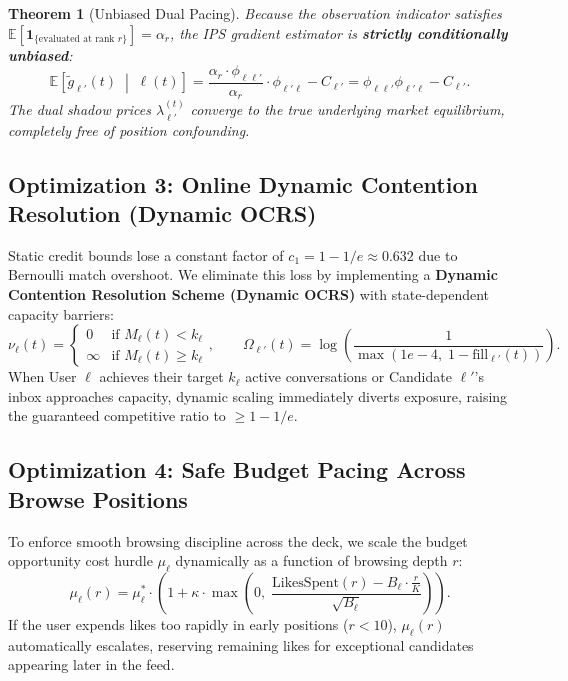 \documentclass[11pt,letterpaper]{article}
\theoremstyle{definition}
\theoremstyle{plain}
\newtheorem{theorem}{Theorem}[section]
\theoremstyle{remark}
\begin{document}
\begin{theorem}[Unbiased Dual Pacing]
Because the observation indicator satisfies $\mathbb{E}[\mathbf{1}_{\{\text{evaluated at rank } r\}}] = \alpha_r$, the IPS gradient estimator is \textbf{strictly conditionally unbiased}:
\begin{equation}
    \mathbb{E}\left[ \tilde{g}_{\ell'}(t) \;\middle|\; \ell(t) \right] = \frac{\alpha_r \cdot \phi_{\ell\ell'}}{\alpha_r} \cdot \phi_{\ell'\ell} - C_{\ell'} = \phi_{\ell\ell'} \phi_{\ell'\ell} - C_{\ell'}.
\end{equation}
The dual shadow prices $\lambda_{\ell'}^{(t)}$ converge to the true underlying market equilibrium, completely free of position confounding.
\end{theorem}

\subsection{Optimization 3: Online Dynamic Contention Resolution (Dynamic OCRS)}
Static credit bounds lose a constant factor of $c_1 = 1 - 1/e \approx 0.632$ due to Bernoulli match overshoot. We eliminate this loss by implementing a \textbf{Dynamic Contention Resolution Scheme (Dynamic OCRS)} with state-dependent capacity barriers:
\begin{equation}
    \nu_\ell(t) = \begin{cases} 0 & \text{if } M_\ell(t) < k_\ell \\ \infty & \text{if } M_\ell(t) \ge k_\ell \end{cases}, \qquad \Omega_{\ell'}(t) = \log\left(\frac{1}{\max(1e-4, \; 1 - \text{fill}_{\ell'}(t))}\right).
\end{equation}
When User $\ell$ achieves their target $k_\ell$ active conversations or Candidate $\ell'$'s inbox approaches capacity, dynamic scaling immediately diverts exposure, raising the guaranteed competitive ratio to $\ge 1 - 1/e$.

\subsection{Optimization 4: Safe Budget Pacing Across Browse Positions}
To enforce smooth browsing discipline across the deck, we scale the budget opportunity cost hurdle $\mu_\ell$ dynamically as a function of browsing depth $r$:
\begin{equation}
    \mu_\ell(r) = \mu_\ell^* \cdot \left( 1 + \kappa \cdot \max\left(0, \; \frac{\text{LikesSpent}(r) - B_\ell \cdot \frac{r}{K}}{\sqrt{B_\ell}} \right) \right).
\end{equation}
If the user expends likes too rapidly in early positions ($r < 10$), $\mu_\ell(r)$ automatically escalates, reserving remaining likes for exceptional candidates appearing later in the feed.
\end{document}
